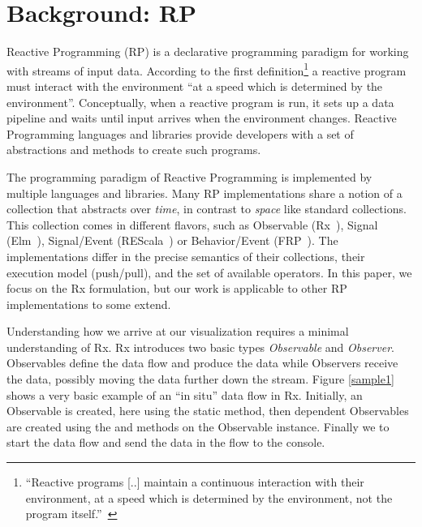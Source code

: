 \section{Background: RP}
\label{background}
\label{nutshell}

Reactive Programming (RP) is a declarative programming paradigm for working with streams of input data. 
According to the first definition\footnote{
``Reactive programs [..] maintain a continuous interaction with their environment, at a speed which is determined by the environment, not the program itself.''~\cite{berry1989real}
} a reactive program must interact with the environment ``at a speed which is determined by the environment''.
Conceptually, when a reactive program is run, it sets up a data pipeline and waits until input arrives when the environment changes.
Reactive Programming languages and libraries provide developers with a set of abstractions and methods to create such programs.

The programming paradigm of Reactive Programming is implemented by multiple languages and libraries. 
Many RP implementations share a notion of a collection that abstracts over \emph{time}, in contrast to \emph{space} like standard collections.
This collection comes in different flavors, 
such as Observable (Rx~\cite{meijer2010subject}), 
Signal (Elm~\cite{czaplicki2012elm}), 
Signal/Event (REScala~\cite{salvaneschi2014rescala}) or 
Behavior/Event (FRP~\cite{elliott1997functional}).
The implementations differ in the precise semantics of their collections, their execution model (push/pull), and the set of available operators.  
In this paper, we focus on the Rx formulation, but our work is applicable to other RP implementations to some extend. 

Understanding how we arrive at our visualization requires a minimal understanding of Rx.
Rx introduces two basic types \emph{Observable} and \emph{Observer}. Observables define the data flow and produce the data while Observers receive the data, possibly moving the data further down the stream. Figure \ref{sample1} shows a very basic example of an ``in situ'' data flow in Rx. Initially, an Observable is created, here using the static  method, then dependent Observables are created using the  and  methods on the Observable instance. Finally we  to start the data flow and send the data in the flow to the console.


